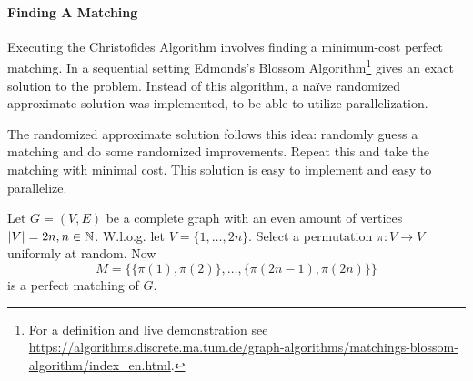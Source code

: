 \begin{minipage}{0.45\textwidth}
  \centering
\end{minipage}
\hfill
\begin{minipage}{0.45\textwidth}
  \centering

\end{minipage}

\paragraph{Finding A Matching}
Executing the Christofides Algorithm involves finding a minimum-cost perfect matching.
In a sequential setting Edmonds's Blossom Algorithm\footnote{For a definition and live demonstration see
\url{https://algorithms.discrete.ma.tum.de/graph-algorithms/matchings-blossom-algorithm/index_en.html}.}
gives an exact solution to the problem.
Instead of this algorithm, a na\"ive randomized approximate solution was implemented,
to be able to utilize parallelization.

The randomized approximate solution follows this idea:
randomly guess a matching and do some randomized improvements.
Repeat this and take the matching with minimal cost.
This solution is easy to implement and easy to parallelize.

\begin{definition}
  Let $G = (V,E)$ be a complete graph with an even amount of vertices
  $|V| = 2n, n \in \mathbb{N}$. W.l.o.g. let $V = \{1,\dots,2n\}$.
  Select a permutation $\pi: V \rightarrow V$ uniformly at random.
  Now $$M = \{\{\pi(1), \pi(2)\}, \dots, \{\pi(2n-1), \pi(2n)\}\}$$
  is a perfect matching of $G$.
  \label{algo:rand_matching}
\end{definition}


